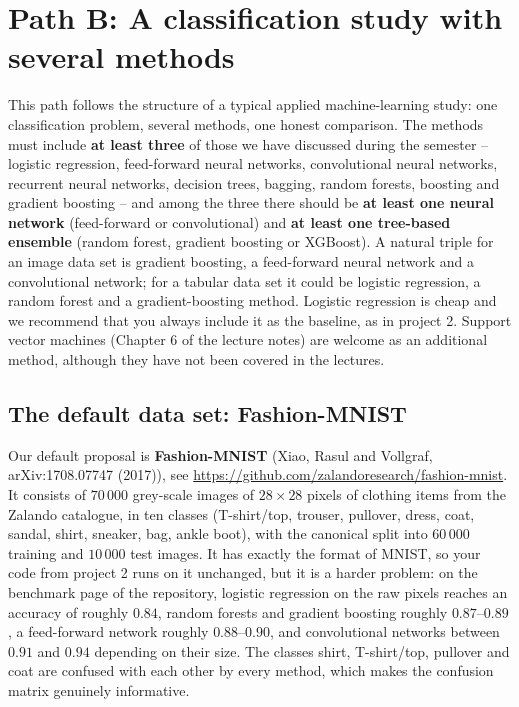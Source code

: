 \documentclass[11pt,a4paper]{article}
\begin{document}
\section*{Path B: A classification study with several methods}

This path follows the structure of a typical applied machine-learning study:
one classification problem, several methods, one honest comparison.  The
methods must include \textbf{at least three} of those we have discussed
during the semester -- logistic regression, feed-forward neural networks,
convolutional neural networks, recurrent neural networks, decision trees,
bagging, random forests, boosting and gradient boosting -- and among the
three there should be \textbf{at least one neural network} (feed-forward or
convolutional) and \textbf{at least one tree-based ensemble} (random forest,
gradient boosting or XGBoost).  A natural triple for an image data set is
gradient boosting, a feed-forward neural network and a convolutional network;
for a tabular data set it could be logistic regression, a random forest and a
gradient-boosting method.  Logistic regression is cheap and we recommend that
you always include it as the baseline, as in project 2.  Support vector
machines (Chapter 6 of the lecture notes) are welcome as an additional
method, although they have not been covered in the lectures.

\subsection*{The default data set: Fashion-MNIST}

Our default proposal is \textbf{Fashion-MNIST} (Xiao, Rasul and Vollgraf,
arXiv:1708.07747 (2017)), see
\url{https://github.com/zalandoresearch/fashion-mnist}.  It consists of
$70\,000$ grey-scale images of $28\times 28$ pixels of clothing items from
the Zalando catalogue, in ten classes (T-shirt/top, trouser, pullover,
dress, coat, sandal, shirt, sneaker, bag, ankle boot), with the canonical
split into $60\,000$ training and $10\,000$ test images.  It has exactly the
format of MNIST, so your code from project 2 runs on it unchanged, but it is
a harder problem: on the benchmark page of the repository, logistic
regression on the raw pixels reaches an accuracy of roughly $0.84$, random
forests and gradient boosting roughly $0.87$--$0.89$, a feed-forward network
roughly $0.88$--$0.90$, and convolutional networks between $0.91$ and
$0.94$ depending on their size.  The classes shirt, T-shirt/top, pullover
and coat are confused with each other by every method, which makes the
confusion matrix genuinely informative.
\end{document}
